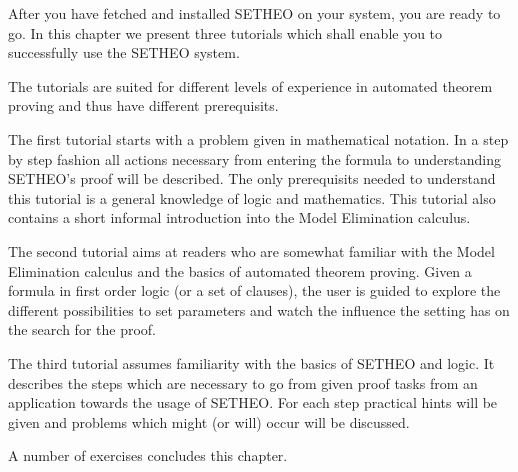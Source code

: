 %

%
After you have fetched and installed SETHEO on your system,
you are ready to go.
In this chapter we present three tutorials which shall enable you to
successfully use the SETHEO system.

The tutorials are suited for different levels of experience in
automated theorem proving and thus have  different prerequisits.

The first tutorial starts with a problem given in mathematical
notation. In a step by step fashion all actions necessary from entering
the formula to understanding SETHEO's proof will be described.
The only prerequisits needed to understand this tutorial is a general
knowledge of logic and mathematics.
This tutorial also contains a short informal introduction into
the Model Elimination calculus.

The second tutorial aims at readers who are somewhat familiar 
with the Model Elimination calculus and the basics of automated theorem
proving. Given a formula in first order logic (or a set of clauses),
the user is guided to explore the different possibilities to set
parameters and watch the influence the setting has on the search
for the proof.

The third tutorial assumes familiarity with the basics of SETHEO
and logic. It describes the steps which are necessary to go from
given proof tasks from an application towards the usage of SETHEO.
For each step practical hints will be given and problems which might
(or will) occur will be discussed.

A number of exercises concludes this chapter.
